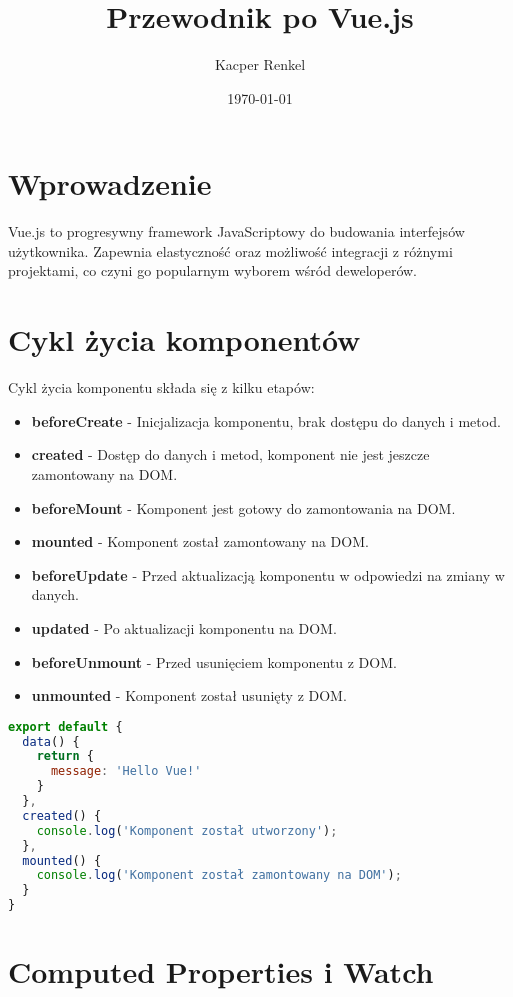 \documentclass[a4paper,12pt]{article}
\title{Przewodnik po Vue.js}
\author{Kacper Renkel}
\date{\today}
\begin{document}
\maketitle

\tableofcontents
\newpage

\section{Wprowadzenie}
Vue.js to progresywny framework JavaScriptowy do budowania interfejsów użytkownika. Zapewnia elastyczność oraz możliwość integracji z różnymi projektami, co czyni go popularnym wyborem wśród deweloperów.

\section{Cykl życia komponentów}
Cykl życia komponentu składa się z kilku etapów:
\begin{itemize}
    \item \textbf{beforeCreate} - Inicjalizacja komponentu, brak dostępu do danych i metod.
    \item \textbf{created} - Dostęp do danych i metod, komponent nie jest jeszcze zamontowany na DOM.
    \item \textbf{beforeMount} - Komponent jest gotowy do zamontowania na DOM.
    \item \textbf{mounted} - Komponent został zamontowany na DOM.
    \item \textbf{beforeUpdate} - Przed aktualizacją komponentu w odpowiedzi na zmiany w danych.
    \item \textbf{updated} - Po aktualizacji komponentu na DOM.
    \item \textbf{beforeUnmount} - Przed usunięciem komponentu z DOM.
    \item \textbf{unmounted} - Komponent został usunięty z DOM.
\end{itemize}

\begin{lstlisting}[language=JavaScript, caption=Przykład użycia cyklu życia komponentu]
export default {
  data() {
    return {
      message: 'Hello Vue!'
    }
  },
  created() {
    console.log('Komponent został utworzony');
  },
  mounted() {
    console.log('Komponent został zamontowany na DOM');
  }
}
\end{lstlisting}

\section{Computed Properties i Watch}
\end{document}
